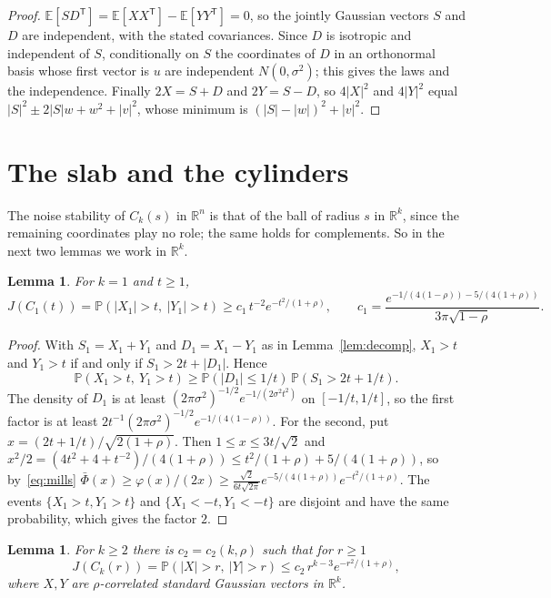 \documentclass[11pt]{amsart}
\newtheorem{lemma}[theorem]{Lemma}
\theoremstyle{remark}
\newcommand{\R}{\mathbb{R}}
\newcommand{\E}{\mathbb{E}}
\newcommand{\Prob}{\mathbb{P}}
\begin{document}
\begin{proof}
$\E[SD^{\mathsf T}]=\E[XX^{\mathsf T}]-\E[YY^{\mathsf T}]=0$, so the jointly Gaussian vectors $S$ and $D$ are
independent, with the stated covariances. Since $D$ is isotropic and independent of $S$, conditionally on $S$ the
coordinates of $D$ in an orthonormal basis whose first vector is $u$ are independent $N(0,\sigma^2)$; this gives the
laws and the independence. Finally $2X=S+D$ and $2Y=S-D$, so $4|X|^2$ and $4|Y|^2$ equal $|S|^2\pm2|S|w+w^2+|v|^2$,
whose minimum is $(|S|-|w|)^2+|v|^2$.
\end{proof}

\section{The slab and the cylinders}\label{sec:proof}

The noise stability of $C_k(s)$ in $\R^n$ is that of the ball of radius $s$ in $\R^k$, since the remaining coordinates
play no role; the same holds for complements. So in the next two lemmas we work in $\R^k$.

\begin{lemma}\label{lem:slab}
For $k=1$ and $t\ge1$,
\[
J(C_1(t))=\Prob(|X_1|>t,\ |Y_1|>t)\ge c_1\,t^{-2}e^{-t^2/(1+\rho)},\qquad
c_1=\frac{e^{-1/(4(1-\rho))-5/(4(1+\rho))}}{3\pi\sqrt{1-\rho}}.
\]
\end{lemma}

\begin{proof}
With $S_1=X_1+Y_1$ and $D_1=X_1-Y_1$ as in Lemma~\ref{lem:decomp}, $X_1>t$ and $Y_1>t$ if and only if
$S_1>2t+|D_1|$. Hence
\[
\Prob(X_1>t,\ Y_1>t)\ge\Prob(|D_1|\le1/t)\,\Prob(S_1>2t+1/t).
\]
The density of $D_1$ is at least $(2\pi\sigma^2)^{-1/2}e^{-1/(2\sigma^2t^2)}$ on $[-1/t,1/t]$, so the first factor is at
least $2t^{-1}(2\pi\sigma^2)^{-1/2}e^{-1/(4(1-\rho))}$. For the second, put $x=(2t+1/t)/\sqrt{2(1+\rho)}$. Then
$1\le x\le3t/\sqrt2$ and $x^2/2=(4t^2+4+t^{-2})/(4(1+\rho))\le t^2/(1+\rho)+5/(4(1+\rho))$, so by~\eqref{eq:mills}
$\bar\Phi(x)\ge\varphi(x)/(2x)\ge\frac{\sqrt2}{6t\sqrt{2\pi}}e^{-5/(4(1+\rho))}e^{-t^2/(1+\rho)}$. The events
$\{X_1>t,Y_1>t\}$ and $\{X_1<-t,Y_1<-t\}$ are disjoint and have the same probability, which gives the factor $2$.
\end{proof}

\begin{lemma}\label{lem:ball}
For $k\ge2$ there is $c_2=c_2(k,\rho)$ such that for $r\ge1$
\[
J(C_k(r))=\Prob(|X|>r,\ |Y|>r)\le c_2\,r^{k-3}e^{-r^2/(1+\rho)},
\]
where $X,Y$ are $\rho$-correlated standard Gaussian vectors in $\R^k$.
\end{lemma}
\end{document}
